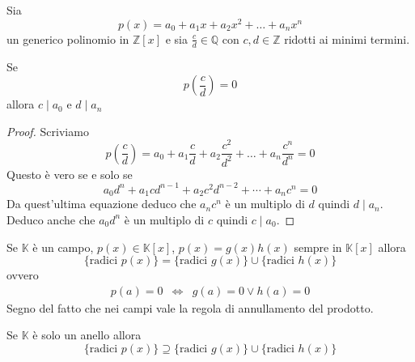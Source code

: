 \begin{theorem}
	Sia
	\begin{equation*}
		p(x) = a_0 + a_1 x + a_2 x^2 + \dots + a_n x^n
	\end{equation*}
	un generico polinomio in $\mathbb{Z}[x]$ e sia $\frac{c}{d}  \in \mathbb{Q}$ con
	$c, d \in \mathbb{Z}$ ridotti ai minimi termini.

	Se
	\begin{equation*}
		p \left( \frac{c}{d} \right) = 0
	\end{equation*}
	allora $c \mid a_0$ e $d \mid a_n$
	\begin{proof}
		Scriviamo
		\begin{equation*}
			p \left( \frac{c}{d} \right) =
			a_0 + a_1 \frac{c}{d} + a_2 \frac{c^2}{d^2} + \dots + a_n \frac{c^n}{d^n} = 0
		\end{equation*}
		Questo \`e vero se e solo se
		\begin{equation*}
			a_0 d^n + a_1 c d^{n - 1} + a_2 c^2 d^{n-2} + \cdots + a_n c^n = 0
		\end{equation*}
		Da quest'ultima equazione deduco che $a_n c^n$ \`e un multiplo di $d$ quindi $d \mid a_n$.
		Deduco anche che $a_0 d^n$ \`e un multiplo di $c$ quindi $c \mid a_0$.
	\end{proof}
\end{theorem}

\begin{theorem}
	Se $\mathbb{K}$ \`e un campo, $p(x) \in \mathbb{K}[x]$, $p(x) = g(x)h(x)$ sempre in
	$\mathbb{K}[x]$ allora
	\begin{equation*}
		\{ \text{radici } p(x) \} =
		\{ \text{radici } g(x) \} \cup \{ \text{radici } h(x) \}
	\end{equation*}
	ovvero
	\begin{equation*}
		\begin{array}{ccc}
			p(a) = 0 & \Leftrightarrow & g(a) = 0 \vee h(a) = 0
		\end{array}
	\end{equation*}
	Segno del fatto che nei campi vale la regola di annullamento del prodotto.
\end{theorem}

\begin{theorem}
	Se $\mathbb{K}$ \`e solo un anello allora
	\begin{equation*}
		\{ \text{radici } p(x) \} \supseteq
		\{ \text{radici } g(x) \} \cup \{ \text{radici } h(x) \}
	\end{equation*}
\end{theorem}

